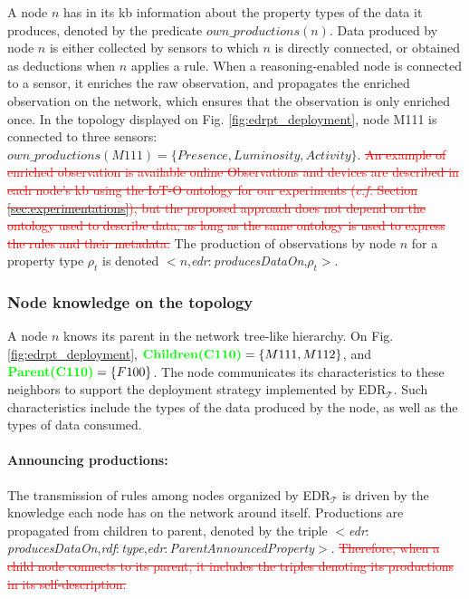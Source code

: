 \documentclass{iosart2c}
\newcommand{\edrt}{EDR$_{\mathcal{T}}$\xspace}
\newcommand{\added}[1]{\textcolor{green}{\textbf{#1}}}
\newcommand{\removed}[1]{\textcolor{red}{\sout{#1}}}
\newcommand{\namespace}[1]{\textit{#1$:$}}
\newcommand{\concept}[2]{\namespace{#1}\-\textit{#2}}
\newcommand{\triplet}[3]{$<$#1,\textit{#2},#3$>$}
\begin{document}
A node $n$ has in its \gls{kb} information about the property types of the data it produces, denoted by the predicate $own\_productions(n)$.
Data produced by node $n$ is either collected by sensors to which $n$ is directly connected, or obtained as deductions when $n$ applies a rule.
When a reasoning-enabled node is connected to a sensor, it enriches the raw observation, and propagates the enriched observation on the network, which ensures that the observation is only enriched once. 
In the topology displayed on Fig. \ref{fig:edrpt_deployment}, node M111 is connected to three sensors: $own\_productions(M111) = \{Presence, Luminosity, Activity\}$.
\removed{An example of enriched observation is available online%
	Observations and devices are described in each node's \gls{kb} using the IoT-O \cite{Seydoux2016} ontology for our experiments (\textit{c.f.} Section \textsection \ref{sec:experimentations}), but the proposed approach does not depend on the ontology used to describe data, as long as the same ontology is used to express the rules and their metadata.}
The production of observations by node $n$ for a property type $\rho_t$ is denoted \triplet{$n$}{\concept{edr}{produces\-Data\-On}}{$\rho_t$}. 

\subsubsection{Node knowledge on the topology}
\label{subsub:topology}

A node $n$ knows its parent in the network tree-like hierarchy. 
On Fig. \ref{fig:edrpt_deployment}, $\added{Children(C110)}=\{M111, M112\}$, and $\added{Parent(C110)}=\{F100\}$.
The node communicates its characteristics to these neighbors to support the deployment strategy implemented by \edrt.
Such characteristics include the types of the data produced by the node, as well as the types of data consumed.

\paragraph{Announcing productions:}
The transmission of rules among nodes organized by \edrt is driven by the knowledge each node has on the network around itself.
Productions are propagated from children to parent, denoted by the triple \triplet{\concept{edr}{produces\-Data\-On}}{\concept{rdf}{type}}{\concept{edr}{Parent\-Announced\-Property}}. 
\removed{Therefore, when a child node connects to its parent, it includes the triples denoting its productions in its self-description.}
\end{document}
